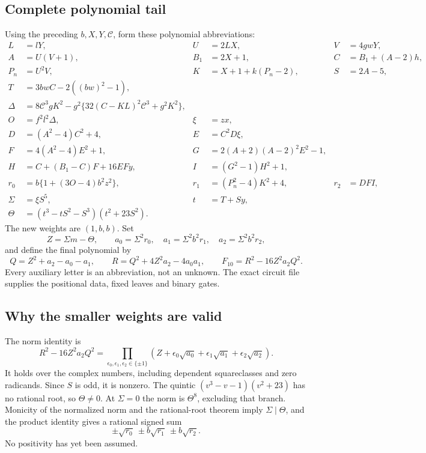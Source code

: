 \subsection{Complete polynomial tail}

Using the preceding $b,X,Y,\mathcal C$, form these polynomial abbreviations:
\begin{align*}
 L&=lY,&U&=2LX,&V&=4gwY,\\
 A&=U(V+1),&B_1&=2X+1,&C&=B_1+(A-2)h,\\
 P_n&=U^2V,&K&=X+1+k(P_n-2),&S&=2A-5,\\
 T&=3bwC-2((bw)^2-1),\\
 \Delta&=8\mathcal C^3gK^2-g^2\{32(C-KL)^2\mathcal C^3+g^2K^2\},\\
 O&=f^2l^2\Delta,&\xi&=zx,\\
 D&=(A^2-4)C^2+4,&E&=C^2D\xi,\\
 F&=4(A^2-4)E^2+1,&G&=2(A+2)(A-2)^2E^2-1,\\
 H&=C+(B_1-C)F+16EFy,&I&=(G^2-1)H^2+1,\\
 r_0&=b\{1+(3O-4)b^2z^2\},&r_1&=(P_n^2-4)K^2+4,&r_2&=DFI,\\
 \Sigma&=\xi S^5,&t&=T+Sy,\\
 \Theta&=(t^3-tS^2-S^3)(t^2+23S^2).
\end{align*}
The new weights are \textbf{$(1,b,b)$}. Set
\[
 Z=\Sigma m-\Theta,\qquad
 a_0=\Sigma^2r_0,\quad a_1=\Sigma^2b^2r_1,\quad a_2=\Sigma^2b^2r_2,
\]
and define the final polynomial by
\[
 Q=Z^2+a_2-a_0-a_1,\qquad R=Q^2+4Z^2a_2-4a_0a_1,
 \qquad F_{10}=R^2-16Z^2a_2Q^2.
\]
Every auxiliary letter is an abbreviation, not an unknown. The exact
circuit file supplies the positional data, fixed leaves and binary gates.

\subsection{Why the smaller weights are valid}

The norm identity is
\[
 R^2-16Z^2a_2Q^2
 =\prod_{\epsilon_0,\epsilon_1,\epsilon_2\in\{\pm1\}}
  (Z+\epsilon_0\sqrt{a_0}+\epsilon_1\sqrt{a_1}+\epsilon_2\sqrt{a_2}).
\]
It holds over the complex numbers, including dependent squareclasses and
zero radicands. Since $S$ is odd, it is nonzero. The quintic
$(v^3-v-1)(v^2+23)$ has no rational root, so $\Theta\ne0$.
At $\Sigma=0$ the norm is $\Theta^8$, excluding that branch. Monicity of
the normalized norm and the rational-root theorem imply
$\Sigma\mid\Theta$, and the product identity gives a rational signed sum
\[
 \pm\sqrt{r_0}\ \pm b\sqrt{r_1}\ \pm b\sqrt{r_2}.
\]
No positivity has yet been assumed.

